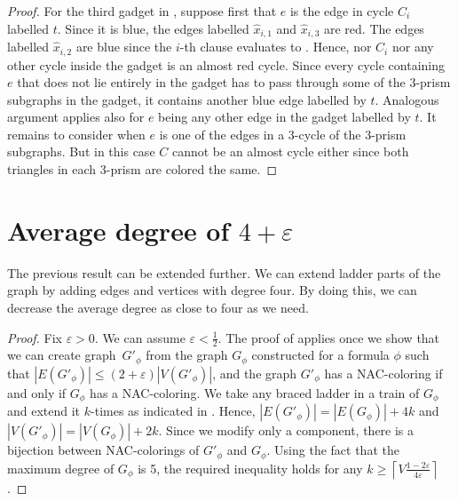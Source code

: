 \begin{proof}
	For the third gadget in ,
	suppose first that $e$ is the edge in cycle $C_i$ labelled $t$.
	Since it is blue, the edges labelled $\hat{x}_{i,1}$ and $\hat{x}_{i,3}$ are red.
	The edges labelled $\hat{x}_{i,2}$ are blue since the $i$-th  clause evaluates to \true{}.
	Hence, nor $C_i$ nor any other cycle inside the gadget is an almost red cycle.
	Since every cycle containing $e$ that does not lie entirely in the gadget
	has to pass through some of the 3-prism subgraphs in the gadget, it contains another blue edge labelled by $t$.
	Analogous argument applies also for $e$ being any other edge in the gadget labelled by $t$.
	It remains to consider when $e$ is one of the edges in a 3-cycle of the 3-prism subgraphs.
	But in this case $C$ cannot be an almost cycle either since both triangles in each 3-prism are colored the same.
\end{proof}


\section{Average degree of \( 4 + \varepsilon \)}


The previous result can be extended further.
We can extend ladder parts of the graph by adding
edges and vertices with degree four.
By doing this, we can decrease the average degree as close to four as we need.

\begin{proof}
	Fix $\varepsilon>0$. We can assume $\varepsilon<\frac{1}{2}$.
	The proof of  applies once we show that
	we can create graph~$G'_\phi$ from the graph $G_\phi$ constructed for a formula $\phi$
	such that $|E(G'_\phi)| \leq (2 + \varepsilon) |V(G'_\phi)|$, and
	the graph $G'_\phi$ has a NAC-coloring if and only if $G_\phi$ has a NAC-coloring.
	We take any braced ladder in a train of $G_\phi$
	and extend it $k$-times as indicated in .
	Hence, $|E(G'_\phi)| = |E(G_\phi)|+4k$ and $|V(G'_\phi)| = |V(G_\phi)|+2k$.
	Since we modify only a \trcon{} component,
	there is a bijection between NAC-colorings of $G'_\phi$ and $G_\phi$.
	Using the fact that the maximum degree of $G_\phi$ is 5,
	the required inequality holds for any  $k\geq\left\lceil V\frac{1-2\varepsilon}{4\varepsilon}\right\rceil$.
\end{proof}
